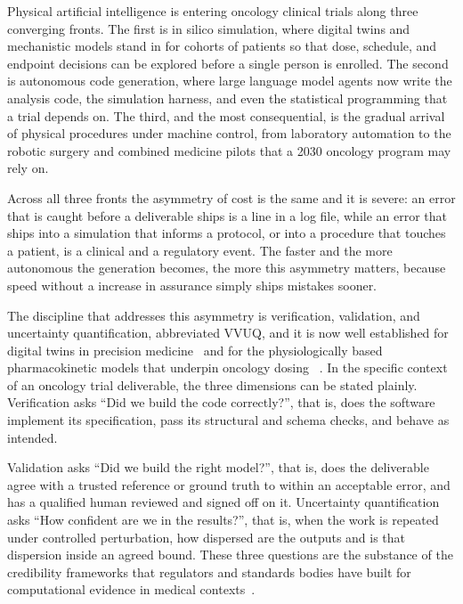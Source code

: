 
Physical artificial intelligence is entering oncology clinical trials along
three converging fronts. The first is in silico simulation, where digital twins
and mechanistic models stand in for cohorts of patients so that dose, schedule,
and endpoint decisions can be explored before a single person is enrolled. The
second is autonomous code generation, where large language model agents now
write the analysis code, the simulation harness, and even the statistical
programming that a trial depends on. The third, and the most consequential, is
the gradual arrival of physical procedures under machine control, from
laboratory automation to the robotic surgery and combined medicine pilots that a
2030 oncology program may rely on. 

Across all three fronts the asymmetry of cost
is the same and it is severe: an error that is caught before a deliverable ships
is a line in a log file, while an error that ships into a simulation that informs
a protocol, or into a procedure that touches a patient, is a clinical and a
regulatory event. The faster and the more autonomous the generation becomes, the
more this asymmetry matters, because speed without a increase in
assurance simply ships mistakes sooner.

The discipline that addresses this asymmetry is verification, validation, and
uncertainty quantification, abbreviated VVUQ, and it is now well established for
digital twins in precision medicine~\cite{sel2025vvuq, moradi2026twins} and for
the physiologically based pharmacokinetic models that underpin oncology dosing
~\cite{zaid2025pbpk}. In the specific context of an oncology trial deliverable,
the three dimensions can be stated plainly. Verification asks ``Did we build the
code correctly?'', that is, does the software implement its specification, pass
its structural and schema checks, and behave as intended.

Validation asks ``Did we build the right model?'', that is, does the deliverable
agree with a trusted reference or ground truth to within an acceptable error, and
has a qualified human reviewed and signed off on it. Uncertainty quantification
asks ``How confident are we in the results?'', that is, when the work is repeated
under controlled perturbation, how dispersed are the outputs and is that
dispersion inside an agreed bound. These three questions are the substance of the
credibility frameworks that regulators and standards bodies have built for
computational evidence in medical contexts~\cite{asmevv40, fda2023credibility}.


